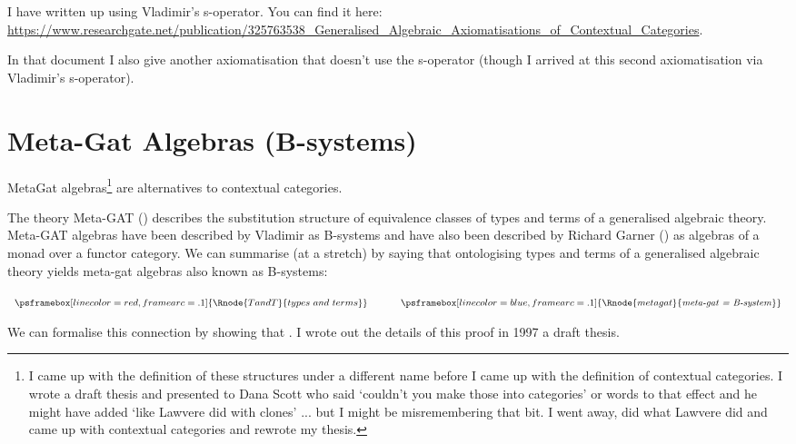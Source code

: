 \documentclass[10pt,a4paper]{article}
\theoremstyle{remark}
\newcommand{\attrtype}[1]{#1}
\renewcommand{\attrtype}[1]{\psframebox[linecolor=blue,framearc=.1]{#1}}
\newcommand{\etype}[1]{#1}
\renewcommand{\etype}[1]{\psframebox[linecolor=red,framearc=.1]{#1}}
\newcommand{\myurl}[1]{{\footnotesize \url{#1}}}
\begin{document}
I have written up  using Vladimir's s-operator.
You can find it here: \\
\myurl{https://www.researchgate.net/publication/325763538_Generalised_Algebraic_Axiomatisations_of_Contextual_Categories}. 

In that document I also give another axiomatisation that doesn't use the s-operator (though I arrived at this second axiomatisation via Vladimir's s-operator).

\section{Meta-Gat Algebras (B-systems)}

\note MetaGat algebras\footnote{I came up with the definition of these structures under a different name before I came up with the definition of contextual categories. I wrote a draft thesis and presented to Dana Scott who said `couldn't you make those into categories' or words to that effect and he might have added `like Lawvere did with clones' ... but I might be misremembering that bit.
I went away, did what Lawvere did and came up with contextual categories and rewrote my thesis.} 
 are alternatives to contextual categories. 
    
\note The theory  Meta-GAT  (\cite{CartmellMetaTheory}) describes the substitution structure of equivalence classes of types and terms of a generalised algebraic theory. Meta-GAT algebras have been described by Vladimir as B-systems and have also been described by Richard Garner (\cite{Garner15}) as algebras of a monad over a functor category.  We can summarise (at a stretch) by saying that ontologising types and terms of a generalised algebraic theory yields meta-gat algebras also known as B-systems:

\begin{center}
$
\begin{array}{ c p{0.5cm} c}
\etype{\Rnode{TandT}{types\ and\ terms}} & & \attrtype{\Rnode{metagat}{\mbox{\textit{meta-gat = B-system}}}}
\end{array}                     
$
\setlength{\arrnodesepA}{7pt}
\setlength{\arrnodesepB}{7pt}
\end{center}

\note
We can formalise this connection by showing that  .  I wrote out the details of this proof in 1997 a draft thesis. 
\end{document}
